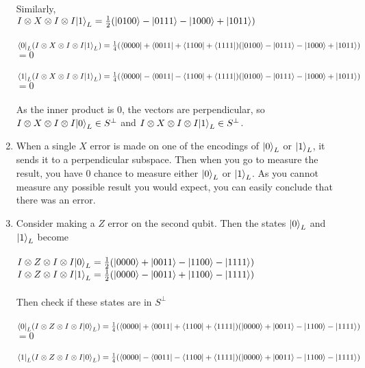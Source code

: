 \documentclass{assignment}
\begin{document}
\begin{problemlist}
\begin{answer}
\begin{enumerate}
      Similarly, \\
      $I \otimes X \otimes I \otimes I \ket{1}_L =\frac{1}{2} (\ket{0100} - \ket{0111} - \ket{1000} + \ket{1011})$\\\\
      $\bra{0}_L(I \otimes X \otimes I \otimes I \ket{1}_L)=\frac{1}{4} (\bra{0000} + \bra{0011} + \bra{1100} + \bra{1111})(\ket{0100} - \ket{0111} - \ket{1000} + \ket{1011})$\\
      $=0$\\\\
      $\bra{1}_L(I \otimes X \otimes I \otimes I \ket{1}_L)=\frac{1}{4} (\bra{0000} - \bra{0011} - \bra{1100} + \bra{1111})(\ket{0100} - \ket{0111} - \ket{1000} + \ket{1011})$\\
      $=0$\\\\
      As the inner product is $0$, the vectors are perpendicular, so $I \otimes X \otimes I \otimes I \ket{0}_L \in S^\perp$ and $I \otimes X \otimes I \otimes I \ket{1}_L \in S^\perp$.
    \item
      When a single $X$ error is made on one of the encodings of $\ket{0}_L$ or $\ket{1}_L$, it sends it to a perpendicular subspace. Then when you go to measure the result, you have $0$ chance to measure either $\ket{0}_L$ or $\ket{1}_L$. As you cannot measure any possible result you would expect, you can easily conclude that there was an error.
    \item
      Consider making a $Z$ error on the second qubit. Then the states $\ket{0}_L$ and $\ket{1}_L$ become\\\\
      $I \otimes Z \otimes I \otimes I \ket{0}_L =\frac{1}{2} (\ket{0000} + \ket{0011} - \ket{1100} - \ket{1111})$\\
      $I \otimes Z \otimes I \otimes I \ket{1}_L =\frac{1}{2} (\ket{0000} - \ket{0011} + \ket{1100} - \ket{1111})$\\\\
      Then check if these states are in $S^\perp$\\\\
      $\bra{0}_L(I \otimes Z \otimes I \otimes I \ket{0}_L) =\frac{1}{4} (\bra{0000} + \bra{0011} + \bra{1100} + \bra{1111})(\ket{0000} + \ket{0011} - \ket{1100} - \ket{1111})$\\
      $=0$\\\\
      $\bra{1}_L(I \otimes Z \otimes I \otimes I \ket{0}_L) =\frac{1}{4} (\bra{0000} - \bra{0011} - \bra{1100} + \bra{1111})(\ket{0000} + \ket{0011} - \ket{1100} - \ket{1111})$\\

\end{enumerate}
\end{answer}
\end{problemlist}
\end{document}
